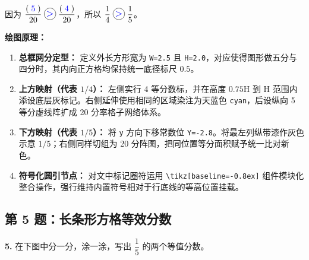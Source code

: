 \begin{center}

\vspace{0.8cm}
{\Large 因为 $\dfrac{(\;\textcolor{blue}{5}\;)}{20} \;\tikz[baseline=-0.8ex] \node[circle, draw, inner sep=1pt, minimum size=1.4em, font=\large] {\textcolor{blue}{$>$}};\; \dfrac{(\;\textcolor{blue}{4}\;)}{20}$，所以 $\dfrac{1}{4} \;\tikz[baseline=-0.8ex] \node[circle, draw, inner sep=1pt, minimum size=1.4em, font=\large] {\textcolor{blue}{$>$}};\; \dfrac{1}{5}$。}
\end{center}

\vspace{0.5cm}
\textbf{绘图原理：}
\begin{enumerate}
    \item \textbf{总框网分定型：} 定义外长方形宽为 \texttt{W=2.5} 且 \texttt{H=2.0}，对应使得图形做五分与四分时，其内向正方格均保持统一底径标尺 $0.5$。
    \item \textbf{上方映射（代表 $1/4$）：} 左侧实行 4 等分数标，并在高度 $0.75\text{H}$ 到 $\text{H}$ 范围内添设底层灰标记。右侧延伸使用相同的区域染注为天蓝色 \texttt{cyan}，后设纵向 5 等分虚线阵扩成 20 分率格子网络体系。
    \item \textbf{下方映射（代表 $1/5$）：} 将 \texttt{y} 方向下移常数位 \texttt{Y=-2.8}。将最左列纵带漆作灰色示意 $1/5$；右侧同样切组为 20 分阵图，把同位置等分面积赋予统一比对新色。
    \item \textbf{符号化圆引节点：} 对文中标记圈符运用 \texttt{\textbackslash tikz[baseline=-0.8ex]} 组件模块化整合操作，强行维持内置符号相对于行底线的等高位置挂载。
\end{enumerate}

\vspace{1.5cm}

\newpage

\subsection{第 5 题：长条形方格等效分数}

\textbf{5.} 在下图中分一分，涂一涂，写出 $\dfrac{1}{5}$ 的两个等值分数。

